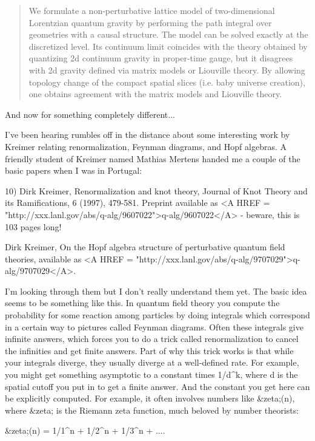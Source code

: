 \begin{quote}
	We formulate a non-perturbative lattice model of
   	two-dimensional Lorentzian quantum gravity by performing the
	path integral over geometries with a causal structure. The
	model can be solved exactly at the discretized level. Its
	continuum limit coincides with the theory obtained by
	quantizing 2d continuum gravity in proper-time gauge, but it
	disagrees with 2d gravity defined via matrix models or
	Liouville theory. By allowing topology change of the compact
	spatial slices (i.e. baby universe creation), one obtains
	agreement with the matrix models and Liouville theory.
\end{quote}
    
And now for something completely different...

I've been hearing rumbles off in the distance about some interesting
work by Kreimer relating renormalization, Feynman diagrams, and Hopf
algebras.  A friendly student of Kreimer named Mathias Mertens
handed me a couple of the basic papers when I was in Portugal:

10) Dirk Kreimer, Renormalization and knot theory, Journal of Knot
Theory and its Ramifications, 6 (1997), 479-581.  Preprint available as
<A HREF = "http://xxx.lanl.gov/abs/q-alg/9607022">q-alg/9607022</A> -
beware, this is 103 pages long!

Dirk Kreimer, On the Hopf algebra structure of perturbative quantum
field theories, available as <A HREF =
"http://xxx.lanl.gov/abs/q-alg/9707029">q-alg/9707029</A>.

I'm looking through them but I don't really understand them yet.  
The basic idea seems to be something like this.  In quantum field
theory you compute the probability for some reaction among particles
by doing integrals which correspond in a certain way to pictures
called Feynman diagrams.  Often these integrals give infinite answers,
which forces you to do a trick called renormalization to cancel the
infinities and get finite answers.  Part of why this trick works is
that while your integrals diverge, they usually diverge at a well-defined 
rate.  For example, you might get something asymptotic to a constant 
times 1/d^k, where d is the spatial cutoff you put in to get a finite 
answer.  And the constant you get here can be explicitly computed.  
For example, it often involves numbers like &zeta;(n), where &zeta; is the 
Riemann zeta function, much beloved by number theorists:

           &zeta;(n) = 1/1^{n} + 1/2^{n} + 1/3^{n} + ....

